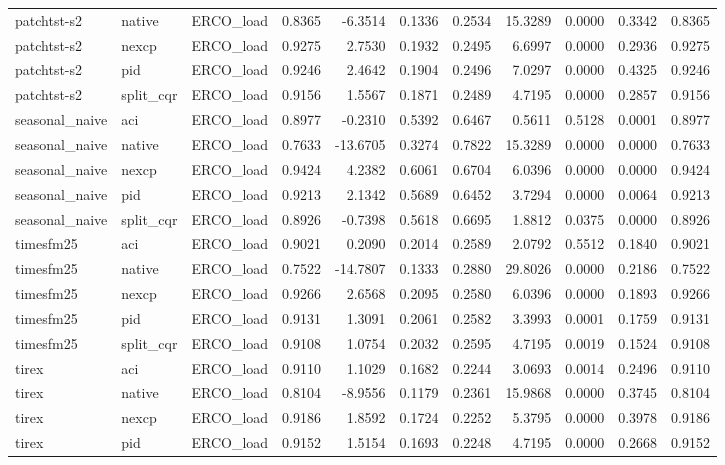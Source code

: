 \begin{tabular}{lllrrrrrrrr}
patchtst-s2 & native & ERCO_load & 0.8365 & -6.3514 & 0.1336 & 0.2534 & 15.3289 & 0.0000 & 0.3342 & 0.8365 \\
patchtst-s2 & nexcp & ERCO_load & 0.9275 & 2.7530 & 0.1932 & 0.2495 & 6.6997 & 0.0000 & 0.2936 & 0.9275 \\
patchtst-s2 & pid & ERCO_load & 0.9246 & 2.4642 & 0.1904 & 0.2496 & 7.0297 & 0.0000 & 0.4325 & 0.9246 \\
patchtst-s2 & split_cqr & ERCO_load & 0.9156 & 1.5567 & 0.1871 & 0.2489 & 4.7195 & 0.0000 & 0.2857 & 0.9156 \\
seasonal_naive & aci & ERCO_load & 0.8977 & -0.2310 & 0.5392 & 0.6467 & 0.5611 & 0.5128 & 0.0001 & 0.8977 \\
seasonal_naive & native & ERCO_load & 0.7633 & -13.6705 & 0.3274 & 0.7822 & 15.3289 & 0.0000 & 0.0000 & 0.7633 \\
seasonal_naive & nexcp & ERCO_load & 0.9424 & 4.2382 & 0.6061 & 0.6704 & 6.0396 & 0.0000 & 0.0000 & 0.9424 \\
seasonal_naive & pid & ERCO_load & 0.9213 & 2.1342 & 0.5689 & 0.6452 & 3.7294 & 0.0000 & 0.0064 & 0.9213 \\
seasonal_naive & split_cqr & ERCO_load & 0.8926 & -0.7398 & 0.5618 & 0.6695 & 1.8812 & 0.0375 & 0.0000 & 0.8926 \\
timesfm25 & aci & ERCO_load & 0.9021 & 0.2090 & 0.2014 & 0.2589 & 2.0792 & 0.5512 & 0.1840 & 0.9021 \\
timesfm25 & native & ERCO_load & 0.7522 & -14.7807 & 0.1333 & 0.2880 & 29.8026 & 0.0000 & 0.2186 & 0.7522 \\
timesfm25 & nexcp & ERCO_load & 0.9266 & 2.6568 & 0.2095 & 0.2580 & 6.0396 & 0.0000 & 0.1893 & 0.9266 \\
timesfm25 & pid & ERCO_load & 0.9131 & 1.3091 & 0.2061 & 0.2582 & 3.3993 & 0.0001 & 0.1759 & 0.9131 \\
timesfm25 & split_cqr & ERCO_load & 0.9108 & 1.0754 & 0.2032 & 0.2595 & 4.7195 & 0.0019 & 0.1524 & 0.9108 \\
tirex & aci & ERCO_load & 0.9110 & 1.1029 & 0.1682 & 0.2244 & 3.0693 & 0.0014 & 0.2496 & 0.9110 \\
tirex & native & ERCO_load & 0.8104 & -8.9556 & 0.1179 & 0.2361 & 15.9868 & 0.0000 & 0.3745 & 0.8104 \\
tirex & nexcp & ERCO_load & 0.9186 & 1.8592 & 0.1724 & 0.2252 & 5.3795 & 0.0000 & 0.3978 & 0.9186 \\
tirex & pid & ERCO_load & 0.9152 & 1.5154 & 0.1693 & 0.2248 & 4.7195 & 0.0000 & 0.2668 & 0.9152 \\

\end{tabular}
